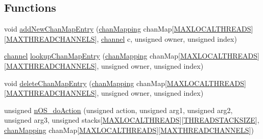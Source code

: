 \subsection*{Functions}
\begin{DoxyCompactItemize}
\item 
void \hyperlink{_swallow-n_o_s_8xc_ae1b5dd3f0d009f2653c26907d24148db}{add\+New\+Chan\+Map\+Entry} (\hyperlink{structchan_mapping}{chan\+Mapping} chan\+Map\mbox{[}\hyperlink{_swallow-n_o_s__asm_8h_a8cb31be9c44f9353186d8189adc6ab61}{M\+A\+X\+L\+O\+C\+A\+L\+T\+H\+R\+E\+A\+D\+S}\mbox{]}\mbox{[}\hyperlink{_swallow-n_o_s__asm_8h_aff3d0aba3f75b128f9002ba839271db8}{M\+A\+X\+T\+H\+R\+E\+A\+D\+C\+H\+A\+N\+N\+E\+L\+S}\mbox{]}, \hyperlink{_swallow-helpers_8h_aa6ea79b51cb1a11714e12ddd689dd15c}{channel} c, unsigned owner, unsigned index)
\item 
\hyperlink{_swallow-helpers_8h_aa6ea79b51cb1a11714e12ddd689dd15c}{channel} \hyperlink{_swallow-n_o_s_8xc_add6720894053f57909489a1eebe35a6e}{lookup\+Chan\+Map\+Entry} (\hyperlink{structchan_mapping}{chan\+Mapping} chan\+Map\mbox{[}\hyperlink{_swallow-n_o_s__asm_8h_a8cb31be9c44f9353186d8189adc6ab61}{M\+A\+X\+L\+O\+C\+A\+L\+T\+H\+R\+E\+A\+D\+S}\mbox{]}\mbox{[}\hyperlink{_swallow-n_o_s__asm_8h_aff3d0aba3f75b128f9002ba839271db8}{M\+A\+X\+T\+H\+R\+E\+A\+D\+C\+H\+A\+N\+N\+E\+L\+S}\mbox{]}, unsigned owner, unsigned index)
\item 
void \hyperlink{_swallow-n_o_s_8xc_a4af9e7a814464d36612c21887f385818}{delete\+Chan\+Map\+Entry} (\hyperlink{structchan_mapping}{chan\+Mapping} chan\+Map\mbox{[}\hyperlink{_swallow-n_o_s__asm_8h_a8cb31be9c44f9353186d8189adc6ab61}{M\+A\+X\+L\+O\+C\+A\+L\+T\+H\+R\+E\+A\+D\+S}\mbox{]}\mbox{[}\hyperlink{_swallow-n_o_s__asm_8h_aff3d0aba3f75b128f9002ba839271db8}{M\+A\+X\+T\+H\+R\+E\+A\+D\+C\+H\+A\+N\+N\+E\+L\+S}\mbox{]}, unsigned owner, unsigned index)
\item 
unsigned \hyperlink{_swallow-n_o_s_8xc_a2433ef0fa73b6c03c9a55759f746b150}{n\+O\+S\+\_\+do\+Action} (unsigned action, unsigned arg1, unsigned arg2, unsigned arg3, unsigned stacks\mbox{[}\hyperlink{_swallow-n_o_s__asm_8h_a8cb31be9c44f9353186d8189adc6ab61}{M\+A\+X\+L\+O\+C\+A\+L\+T\+H\+R\+E\+A\+D\+S}\mbox{]}\mbox{[}\hyperlink{_swallow-n_o_s__asm_8h_a21e454ec7311762ec0390b5c771791c1}{T\+H\+R\+E\+A\+D\+S\+T\+A\+C\+K\+S\+I\+Z\+E}\mbox{]}, \hyperlink{structchan_mapping}{chan\+Mapping} chan\+Map\mbox{[}\hyperlink{_swallow-n_o_s__asm_8h_a8cb31be9c44f9353186d8189adc6ab61}{M\+A\+X\+L\+O\+C\+A\+L\+T\+H\+R\+E\+A\+D\+S}\mbox{]}\mbox{[}\hyperlink{_swallow-n_o_s__asm_8h_aff3d0aba3f75b128f9002ba839271db8}{M\+A\+X\+T\+H\+R\+E\+A\+D\+C\+H\+A\+N\+N\+E\+L\+S}\mbox{]})

\end{DoxyCompactItemize}
